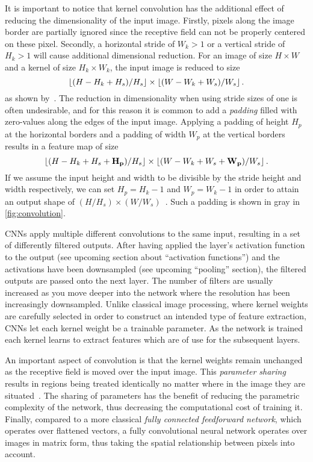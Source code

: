It is important to notice that kernel convolution has the additional effect of reducing the dimensionality of the input image.
Firstly, pixels along the image border are partially ignored since the receptive field can not be properly centered on these pixel.
Secondly, a horizontal stride of $W_k > 1$ or a vertical stride of $H_k > 1$ will cause additional dimensional reduction.
For an image of size $H \times W$ and a kernel of size $H_k \times W_k$, the input image is reduced to size
%
\begin{equation*}
  \left\lfloor (H - H_k + H_s) / H_s \right\rfloor
  \times
  \left\lfloor (W - W_k + W_s) / W_s \right\rfloor.
\end{equation*}
%
as shown by~\cite{dive-into-deep-learning}.
The reduction in dimensionality when using stride sizes of one is often undesirable, and for this reason it is common to add a \textit{padding} filled with zero-values along the edges of the input image.
Applying a padding of height $H_p$ at the horizontal borders and a padding of width $W_p$ at the vertical borders results in a feature map of size
%
\begin{equation*}
  \left\lfloor (H - H_k + H_s + \mathbf{H_p}) / H_s \right\rfloor
  \times
  \left\lfloor (W - W_k + W_s + \mathbf{W_p}) / W_s \right\rfloor.
\end{equation*}
%
If we assume the input height and width to be divisible by the stride height and width respectively, we can set $H_p = H_k - 1$ and $W_p = W_k - 1$ in order to attain an output shape of $(H / H_s) \times (W / W_s)$~\cite{dive-into-deep-learning}.
Such a padding is shown in gray in \cref{fig:convolution}.

CNNs apply multiple different convolutions to the same input, resulting in a set of differently filtered outputs.
After having applied the layer's activation function to the output (see upcoming section about \enquote{activation functions}) and the activations have been downsampled (see upcoming \enquote{pooling} section), the filtered outputs are passed onto the next layer.
The number of filters are usually increased as you move deeper into the network where the resolution has been increasingly downsampled.
Unlike classical image processing, where kernel weights are carefully selected in order to construct an intended type of feature extraction, CNNs let each kernel weight be a trainable parameter.
As the network is trained each kernel learns to extract features which are of use for the subsequent layers.

An important aspect of convolution is that the kernel weights remain unchanged as the receptive field is moved over the input image.
This \textit{parameter sharing} results in regions being treated identically no matter where in the image they are situated~\cite{visint-cnn}.
The sharing of parameters has the benefit of reducing the parametric complexity of the network, thus decreasing the computational cost of training it.
Finally, compared to a more classical \textit{fully connected feedforward network}, which operates over flattened vectors, a fully convolutional neural network operates over images in matrix form, thus taking the spatial relationship between pixels into account.
